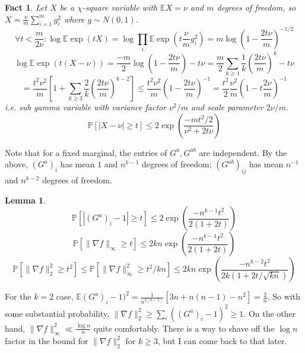 \documentclass{article}
\newtheorem{lemma}[theorem]{Lemma}
\newtheorem{fact}[theorem]{Fact}
\newcommand{\E}{\mathbb{E}}
\renewcommand{\Pr}{\mathbb{P}}
\begin{document}
\begin{fact}
Let $X$ be a $\chi$-square variable with $\E X = \nu$ and $m$ degrees of freedom, so $X = \frac{\nu}{m} \sum_{i=1}^{m} g_{i}^{2}$ where $g \sim N(0,1)$. 
\[ \forall t < \frac{m}{2\nu}: \log \E \exp(t X) = \log \prod_{i} \E \exp(t \frac{\nu}{m} g_{i}^{2}) = m \log \left(1 - \frac{2 t \nu}{m} \right)^{-1/2}  \]
\[ \log \E \exp(t(X - \nu)) = \frac{-m}{2} \log \left(1 - \frac{2 t \nu}{m} \right) - t \nu = \frac{m}{2} \sum_{k \geq 1} \frac{1}{k} \left( \frac{2 t \nu}{m} \right)^{k} - t \nu \]
\[ = \frac{t^{2} \nu^{2}}{m} \left[ 1 + \sum_{k \geq 3} \frac{2}{k} \left( \frac{2 t \nu}{m} \right)^{k-2} \right] \leq \frac{t^{2} \nu^{2}}{m} \left(1 -  \frac{2 t \nu}{m} \right)^{-1} = \frac{t^{2}}{2}\frac{\nu^{2}}{m} \left(1 - t \frac{2 \nu}{m} \right)^{-1}  \]
i.e. sub gamma variable with variance factor $\nu^{2}/m$ and scale parameter $2 \nu / m$. 
\[ \Pr[ | X - \nu | \geq t ] \leq 2 \exp \left( \frac{-m t^{2}/2}{\nu^{2} + 2t \nu} \right)    \]
\end{fact}

Note that for a fixed marginal, the entries of $G^{a}, G^{ab}$ are independent. By the above, $(G^{a})_{i}$ has mean $1$ and $n^{k-1}$ degrees of freedom; $(G^{ab})_{ij}$ has mean $n^{-1}$ and $n^{k-2}$ degrees of freedom. 

\begin{lemma}
\[ \Pr[ |(G^{a})_{i} - 1| \geq t ] \leq 2 \exp \left( \frac{- n^{k-1} t^{2}}{2(1 + 2t)} \right)  \]
\[ \Pr [ \|\nabla f\|_{\infty} \geq t ] \leq 2kn \exp \left( \frac{- n^{k-1} t^{2}}{2(1 + 2t)} \right)  \]
\[  \Pr [ \|\nabla f\|_{2}^{2} \geq t^{2} ] \leq \Pr[ \|\nabla f\|_{\infty}^{2} \geq t^{2}/kn ] \leq 2kn \exp \left( \frac{- n^{k-2} t^{2}}{2k(1+2t/\sqrt{kn})}  \right) \]
\end{lemma}
For the $k=2$ case, $\E (G^{a})_{i} - 1)^{2} = \frac{1}{n^{2(k-1)}}[3n + n(n-1) - n^{2}] = \frac{2}{n}$. So with some substantial probability, $\|\nabla f\|_{2}^{2} \geq \sum_{i} ((G^{a})_{i} - 1)^{2} \geq 1$. On the other hand, $\|\nabla f\|_{\infty}^{2} \ll \frac{\log n}{n}$ quite comfortably. There is a way to shave off the $\log n$ factor in the bound for $\|\nabla f\|_{2}^{2}$ for $k \geq 3$, but I can come back to that later. 
\end{document}
